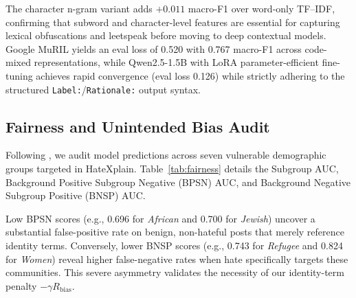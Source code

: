 \documentclass[11pt]{article}
\begin{document}
The character n-gram variant adds $+0.011$ macro-F1 over word-only TF--IDF, confirming that subword and character-level features are essential for capturing lexical obfuscations and leetspeak before moving to deep contextual models. Google MuRIL yields an eval loss of 0.520 with 0.767 macro-F1 across code-mixed representations, while Qwen2.5-1.5B with LoRA parameter-efficient fine-tuning achieves rapid convergence (eval loss 0.126) while strictly adhering to the structured \texttt{Label:}/\texttt{Rationale:} output syntax.

\subsection{Fairness and Unintended Bias Audit}
Following \citet{borkan2019nuanced}, we audit model predictions across seven vulnerable demographic groups targeted in HateXplain. Table~\ref{tab:fairness} details the Subgroup AUC, Background Positive Subgroup Negative (BPSN) AUC, and Background Negative Subgroup Positive (BNSP) AUC.

\begin{table}[t]
\centering
\small
{}
\caption{Demographic fairness audit on HateXplain test set across seven protected identity groups before and after Phase 3 reward preference calibration.}
\label{tab:fairness}
\end{table}

Low BPSN scores (e.g., 0.696 for \emph{African} and 0.700 for \emph{Jewish}) uncover a substantial false-positive rate on benign, non-hateful posts that merely reference identity terms. Conversely, lower BNSP scores (e.g., 0.743 for \emph{Refugee} and 0.824 for \emph{Women}) reveal higher false-negative rates when hate specifically targets these communities. This severe asymmetry validates the necessity of our identity-term penalty $-\gamma R_{\text{bias}}$.
\end{document}
